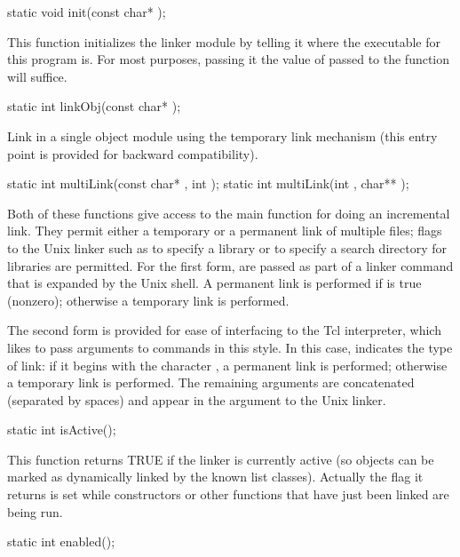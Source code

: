 \begin{example}
static void init(const char* );
\end{example}

This function initializes the linker module by telling it where the
executable for this program is.  For most purposes, passing it the
value of  passed to the  function will
suffice.

\begin{example}
static int linkObj(const char* );
\end{example}

Link in a single object module using the temporary link mechanism
(this entry point is provided for backward compatibility).

\begin{example}
static int multiLink(const char* , int );
static int multiLink(int , char** );
\end{example}

Both of these functions give access to the main function for doing
an incremental link.  They permit either a temporary or a permanent
link of multiple files; flags to the Unix linker such as 
to specify a library or  to specify a search directory for
libraries are permitted.  For the first form,  are passed
as part of a linker command that is expanded by the Unix shell.  A
permanent link is performed if  is true (nonzero);
otherwise a temporary link is performed.

The second form is provided for ease of interfacing to the Tcl
interpreter, which likes to pass arguments to commands in this
style.  In this case,  indicates the type of
link: if it begins with the character , a permanent link
is performed; otherwise a temporary link is performed.  The remaining
arguments are concatenated (separated by spaces) and appear in the
argument to the Unix linker.

\begin{example}
static int isActive();
\end{example}

This function returns TRUE if the linker is currently active (so objects
can be marked as dynamically linked by the known list classes).
Actually the flag it returns is set while constructors or other
functions that have just been linked are being run.

\begin{example}
static int enabled();
\end{example}

